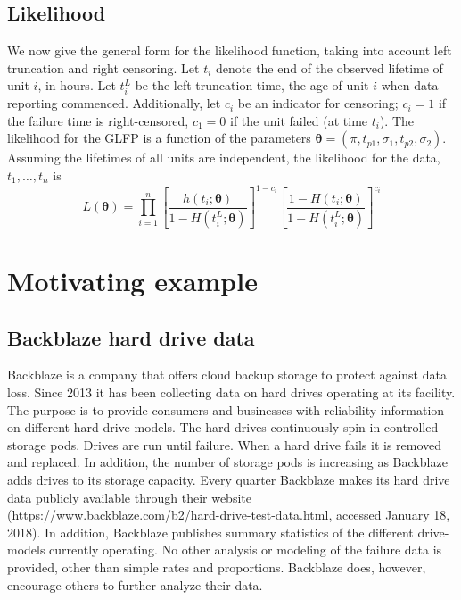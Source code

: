 \documentclass[12pt]{article}
\begin{document}
\subsection{Likelihood}
We now give the general form for the likelihood function, taking into account left truncation and right censoring.  Let $t_{i}$ denote the end of the observed lifetime of unit $i$, in hours.  Let $t_i^L$ be the left truncation time, the age of unit $i$ when data reporting commenced. Additionally, let $c_i$ be an indicator for censoring; $c_i=1$ if the failure time is right-censored, $c_1=0$ if the unit failed (at time $t_i$). The likelihood for the GLFP is a function of the parameters $\bm{\theta} = (\pi,t_{p1}, \sigma_1, t_{p2}, \sigma_2)$.  Assuming the lifetimes of all units are independent, the likelihood for the data, $t_1,\ldots,t_n$ is
\begin{equation*}
L(\bm{\theta})= \prod_{i=1}^{n} \left[\frac{h(t_i;\bm{\theta})}{1-H(t_i^L;\bm{\theta})}\right]^{1-c_i} \left[ \frac{1-H(t_i;\bm{\theta})}{1-H(t_i^L;\bm{\theta})} \right]^{c_i}
\end{equation*}

\section{Motivating example}
\label{sec:Data}
\subsection{Backblaze hard drive data}
Backblaze is a company that offers cloud backup storage to protect against data loss.  Since 2013 it has been collecting data on hard drives operating at its facility.  The purpose is to provide consumers and businesses with reliability information on different hard drive-models.  The hard drives continuously spin in controlled storage pods.  Drives are run until failure.  When a hard drive fails it is removed and replaced.  In addition, the number of storage pods is increasing as Backblaze adds drives to its storage capacity.  Every quarter Backblaze makes its hard drive data publicly available through their website (\url{https://www.backblaze.com/b2/hard-drive-test-data.html}, accessed January 18, 2018)\nocite{backblaze}. In addition, Backblaze publishes summary statistics of the different drive-models currently operating.  No other analysis or modeling of the failure data is provided, other than simple rates and proportions.  Backblaze does, however, encourage others to further analyze their data. 
\end{document}
